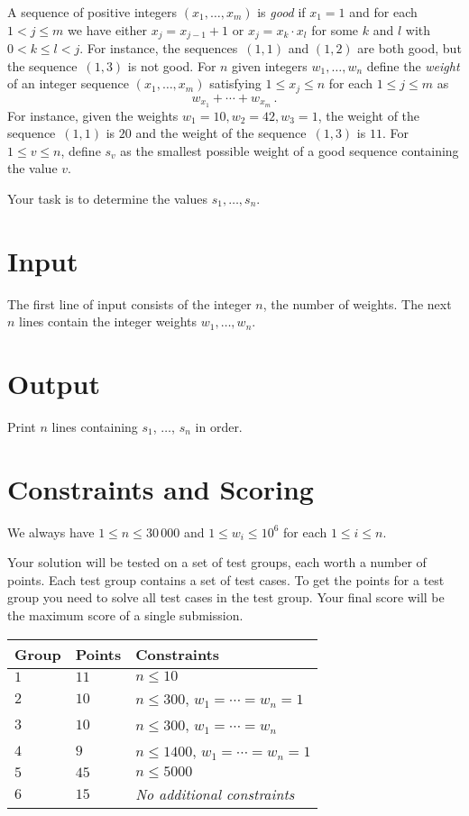 
\noindent
A sequence of positive integers $(x_1,\ldots,x_m)$ is \emph{good} if  $x_1 = 1$ and for each $1 < j \leq m$ we have either $x_j=x_{j-1}+1$ or $x_j=x_k\cdot x_l$ for some $k$ and $l$ with $0< k\leq l< j$.
For instance, the sequences~$(1,1)$ and $(1,2)$ are both good, but the sequence~$(1,3)$ is not good.
For  $n$ given integers $w_1,\ldots,w_n$ define 
the \emph{weight} of an integer sequence $(x_1,\ldots,x_m)$ satisfying $1\leq x_j \leq n$ for each $1\leq j\leq m$ as
\[ w_{x_1} +\cdots +w_{x_m}\,.\] 
For instance, given the weights $w_1=10,  w_2=42,w_3= 1$, the weight of the sequence~$(1,1)$ is $20$ and the weight of the sequence~$(1,3)$ is $11$.
For $1\leq v\leq n$, define $s_v$ as the smallest possible weight of a good sequence containing the value $v$.

Your task is to determine the values $s_1,\ldots ,s_n$.

\section*{Input}

The first line of input consists of the integer $n$, the number of weights.
The next $n$ lines contain the integer weights $w_1, \ldots, w_n$.

\section*{Output}

Print $n$ lines containing $s_1$, $\ldots$, $s_n$ in order.

\section*{Constraints and Scoring}

We always have
$1\leq n \leq 30\,000$ %
and
$1\leq w_i \leq 10^6$ for each $1\leq i \leq n$.%

Your solution will be tested on a set of test groups, each worth a number of points.
Each test group contains a set of test cases.
To get the points for a test group you need to solve all test cases in the test group.
Your final score will be the maximum score of a single submission.

\medskip
\begin{tabular}{lll}
Group & Points & Constraints \\\hline
$1$   & $11$ & $n\leq 10$ \\
$2$   & $10$ & $n\leq 300$, $w_1=\cdots=w_n = 1$ \\
$3$   & $10$ & $n\leq 300$, $w_1=\cdots=w_n$ \\ %
$4$   & $9$ & $n\leq 1400$, $w_1=\cdots=w_n = 1$ \\
$5$   & $45$ & $n\leq 5000$\\
$6$   & $15$ & \emph{No additional constraints}
\end{tabular}
